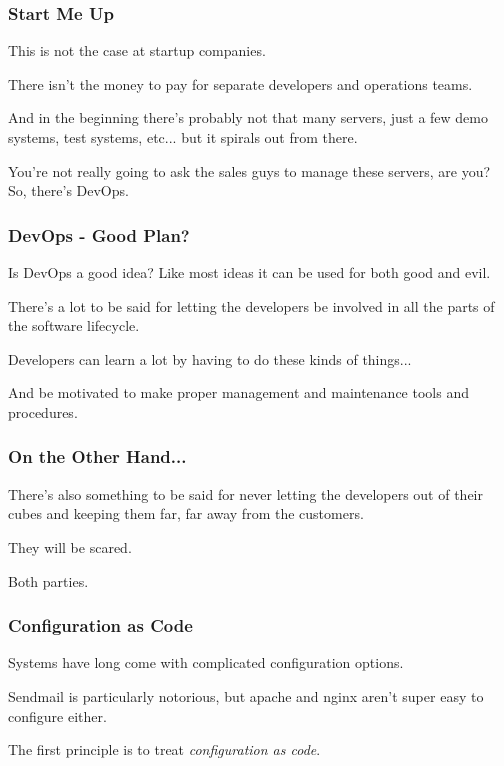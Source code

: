\begin{frame}
\frametitle{Start Me Up}

This is not the case at startup companies. 

There isn't the money to pay for separate developers and operations teams. 

And in the beginning there's probably not that many servers, just a few demo systems, test systems, etc... but it spirals out from there. 

You're not really going to ask the sales guys to manage these servers, are you? So, there's DevOps. 


\end{frame}



\begin{frame}
\frametitle{DevOps - Good Plan?}

Is DevOps a good idea? Like most ideas it can be used for both good and evil. 

There's a lot to be said for letting the developers be involved in all the parts of the software lifecycle.

Developers can learn a lot by having to do these kinds of things... 

And be motivated to make proper management and maintenance tools and procedures. 


\end{frame}



\begin{frame}
\frametitle{On the Other Hand...}

There's also something to be said for never letting the developers out of their cubes and keeping them far, far away from the customers. 

They will be scared. 

Both parties.


\end{frame}



\begin{frame}
\frametitle{Configuration as Code}

Systems have long come with complicated configuration options.


Sendmail is particularly notorious, but apache and nginx aren't super
easy to configure either.

The first principle is to treat \emph{configuration as code}.

\end{frame}



